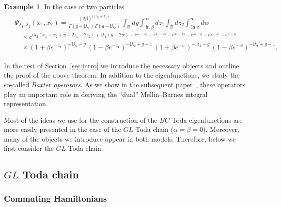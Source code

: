 \documentclass[11pt]{article}
\numberwithin{equation}{section}
\theoremstyle{plain}
\theoremstyle{definition}
\newtheorem{example}{Example}
\renewcommand{\imath}{\mathrm{i}}
\begin{document}
\begin{example}
	In the case of two particles 
	\begin{align}
		\begin{aligned}
			& \Psi_{\lambda_1, \lambda_2}(x_1, x_2) = \frac{(2\beta)^{\imath (\lambda_1 + \lambda_2)}}{\Gamma ( g - \imath \lambda_1) \, \Gamma(g - \imath \lambda_2)} \, \int_{\mathbb{R}} dy \int_{\ln \beta}^\infty dz_1 \int_{\mathbb{R}} dz_2 \int_{\ln \beta}^\infty dw \\[6pt]
			& \quad \times e^{ \imath \lambda_2 (x_1 + x_2 + y - 2z_1 - 2z_2) + \imath \lambda_1 (y - 2w) - e^{z_1 - x_1}  - e^{x_1 - z_2} - e^{z_2 - x_2} - e^{z_1 - y} - e^{y - z_2} - e^{w - y} } \\[6pt]
			& \quad \times (1 + \beta e^{-z_1})^{- \imath \lambda_2 - g} \, (1 - \beta e^{-z_1})^{- \imath \lambda_2 + g - 1 } \,  (1 + \beta e^{-w})^{- \imath \lambda_1 - g} \, (1 - \beta e^{-w})^{- \imath \lambda_1 + g - 1 }.
		\end{aligned}
	\end{align}
\end{example}

In the rest of Section~\ref{sec:intro} we introduce the necessary objects and outline the proof of the above theorem. In addition to the eigenfunctions, we study the so-called \textit{Baxter operators}. As we show in the subsequent paper~\cite{BDK}, these operators play an important role in deriving the “dual” Mellin--Barnes integral representation.

Most of the ideas we use for the construction of the $BC$ Toda eigenfunctions are more easily presented in the case of the $GL$ Toda chain ($\alpha = \beta = 0$). Moreover, many of the objects we introduce appear in both models. Therefore, below we first consider the $GL$ Toda chain.

\subsection{$GL$ Toda chain}

\subsubsection{Commuting Hamiltonians}
\end{document}
